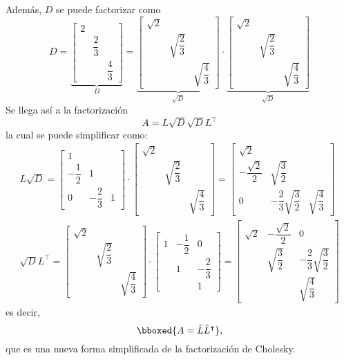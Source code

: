 Además, $D$ se puede factorizar como \[ D=\underbrace{\begin{bmatrix}
		2 & & \\
		& \dfrac{2}{3} & \\
		& & \dfrac{4}{3}
\end{bmatrix}}_D=\underbrace{\begin{bmatrix}
\sqrt{2} & & \\
& \sqrt{\dfrac{2}{3}} & \\
& & \sqrt{\dfrac{4}{3}}
\end{bmatrix}}_{\sqrt{D}}\cdot\underbrace{\begin{bmatrix}
\sqrt{2} & & \\
& \sqrt{\dfrac{2}{3}} & \\
& & \sqrt{\dfrac{4}{3}}
\end{bmatrix}}_{\sqrt{D}} \]
Se llega así a la factorización \[ A=L\sqrt{D}\sqrt{D}L^\intercal \] la cual se puede simplificar como: \[ \begin{array}{l}
	L\sqrt{D}=\begin{bmatrix}
		1 &  & \\
		-\dfrac{1}{2} & 1 &  \\
		0 & -\dfrac{2}{3} & 1
	\end{bmatrix}\cdot\begin{bmatrix}
	\sqrt{2} & & \\
	& \sqrt{\dfrac{2}{3}} & \\
	& & \sqrt{\dfrac{4}{3}}
	\end{bmatrix}=\begin{bmatrix}
	\sqrt{2} &  &  \\ 
	-\dfrac{\sqrt{2}}{2} & \sqrt{\dfrac{3}{2}} &  \\ 
	0 & -\dfrac{2}{3}\sqrt{\dfrac{3}{2}} & \sqrt{\dfrac{4}{3}}
	\end{bmatrix}\\
	\sqrt{D}L^\intercal=\begin{bmatrix}
\sqrt{2} & & \\
& \sqrt{\dfrac{2}{3}} & \\
& & \sqrt{\dfrac{4}{3}}
\end{bmatrix}\cdot\begin{bmatrix}
1 & -\dfrac{1}{2} &0  \\
 & 1 & -\dfrac{2}{3} \\
&  & 1
\end{bmatrix}=\begin{bmatrix}
\sqrt{2} & -\dfrac{\sqrt{2}}{2} & 0 \\ 
 & \sqrt{\dfrac{3}{2}} & -\dfrac{2}{3}\sqrt{\dfrac{3}{2}} \\ 
 &  & \sqrt{\dfrac{4}{3}}
\end{bmatrix} 
\end{array} \] es decir, \[ \bboxed{A=\tilde{L}\tilde{L}^\intercal}, \]que es una nueva forma simplificada de la factorización de Cholesky.

